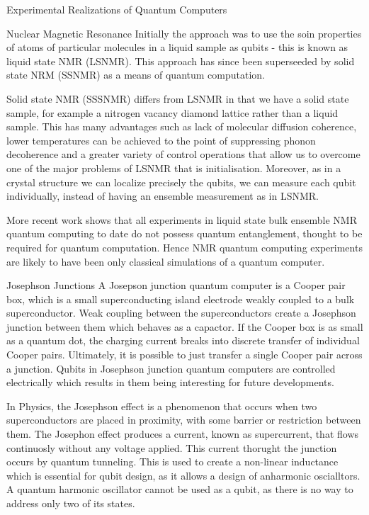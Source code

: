 \documentclass[aps,twocolumn,preprintnumbers]{revtex4}
\begin{document}
\begin{section}{Experimental Realizations of Quantum Computers}
\begin{subsection}{Nuclear Magnetic Resonance}
Initially the approach was to use the soin properties of atoms of particular molecules in a liquid sample as qubits - 
this is known as liquid state NMR (LSNMR). 
This approach has since been superseeded by solid state NRM (SSNMR) as a means of quantum computation.

Solid state NMR (SSSNMR) differs from LSNMR in that we have a solid state sample, 
for example a nitrogen vacancy diamond lattice rather than a liquid sample. 
This has many advantages such as lack of molecular diffusion coherence, 
lower temperatures can be achieved to the point of suppressing phonon decoherence and a greater variety of control operations that allow us to overcome one of the major problems of LSNMR that is initialisation. 
Moreover, as in a crystal structure we can localize precisely the qubits, 
we can measure each qubit individually, 
instead of having an ensemble measurement as in LSNMR. 

More recent work shows that all experiments in liquid state bulk ensemble NMR quantum computing to date do not possess quantum entanglement, 
thought to be required for quantum computation. 
Hence NMR quantum computing experiments are likely to have been only classical simulations of a quantum computer. 
\end{subsection}

\begin{subsection}{Josephson Junctions}
A Josepson junction quantum computer is a Cooper pair box,
which is a small superconducting island electrode weakly coupled to a bulk superconductor. 
Weak coupling between the superconductors create a Josephson junction between them which behaves as a capactor. 
If the Cooper box is as small as a quantum dot, 
the charging current breaks into discrete transfer of individual Cooper pairs. 
Ultimately, it is possible to just transfer a single Cooper pair across a junction. 
Qubits in Josephson junction quantum computers are controlled electrically which results in them being interesting for future developments.

In Physics, the Josephson effect is a phenomenon that occurs when two superconductors are placed in proximity, 
with some barrier or restriction between them. 
The Josephon effect produces a current, known as supercurrent, that flows continuosly without any voltage applied. 
This current thorught the junction occurs by quantum tunneling. 
This is used to create a non-linear inductance which is essential for qubit design, 
as it allows a design of anharmonic oscialltors. 
A quantum harmonic oscillator cannot be used as a qubit, 
as there is no way to address only two of its states. 
\end{subsection}

\end{section}
\end{document}
